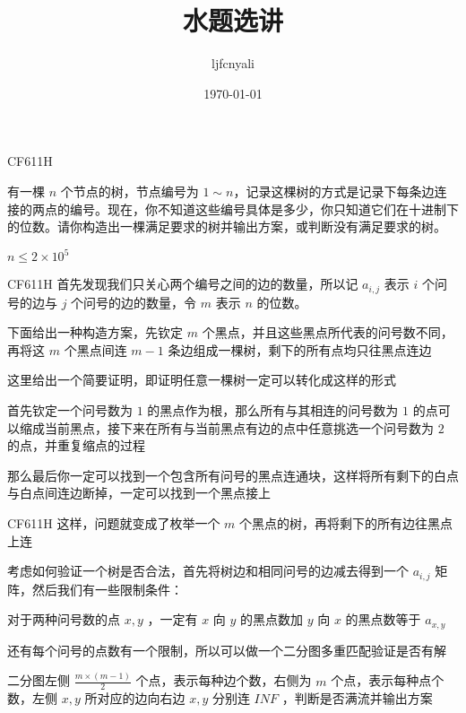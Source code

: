 \documentclass[9pt]{beamer}
\title{水题选讲}
\date{\today}
\author{ljfcnyali}
\begin{document}
  \maketitle

  \begin{frame}{CF611H}
    \par 有一棵 $n$ 个节点的树，节点编号为 $1 \sim n$，记录这棵树的方式是记录下每条边连接的两点的编号。现在，你不知道这些编号具体是多少，你只知道它们在十进制下的位数。请你构造出一棵满足要求的树并输出方案，或判断没有满足要求的树。
    \par $n \le 2 \times 10^5$
  \end{frame}
  
  \begin{frame}{CF611H}
     首先发现我们只关心两个编号之间的边的数量，所以记 $a_{i,j}$ 表示 $i$ 个问号的边与 $j$ 个问号的边的数量，令 $m$ 表示 $n$ 的位数。

     下面给出一种构造方案，先钦定 $m$ 个黑点，并且这些黑点所代表的问号数不同，再将这 $m$ 个黑点间连 $m-1$ 条边组成一棵树，剩下的所有点均只往黑点连边

     这里给出一个简要证明，即证明任意一棵树一定可以转化成这样的形式

     首先钦定一个问号数为 $1$ 的黑点作为根，那么所有与其相连的问号数为 $1$ 的点可以缩成当前黑点，接下来在所有与当前黑点有边的点中任意挑选一个问号数为 $2$ 的点，并重复缩点的过程

     那么最后你一定可以找到一个包含所有问号的黑点连通块，这样将所有剩下的白点与白点间连边断掉，一定可以找到一个黑点接上
  \end{frame}

  \begin{frame}{CF611H}
     这样，问题就变成了枚举一个 $m$ 个黑点的树，再将剩下的所有边往黑点上连

     考虑如何验证一个树是否合法，首先将树边和相同问号的边减去得到一个 $a_{i,j}$ 矩阵，然后我们有一些限制条件：

     对于两种问号数的点 $x,y$ ，一定有 $x$ 向 $y$ 的黑点数加 $y$ 向 $x$ 的黑点数等于 $a_{x, y}$ 

     还有每个问号的点数有一个限制，所以可以做一个二分图多重匹配验证是否有解

     二分图左侧 $\frac{m\times (m-1)}{2}$ 个点，表示每种边个数，右侧为 $m$ 个点，表示每种点个数，左侧 $x,y$ 所对应的边向右边 $x,y$ 分别连 $INF$ ，判断是否满流并输出方案
  \end{frame}
\end{document}
